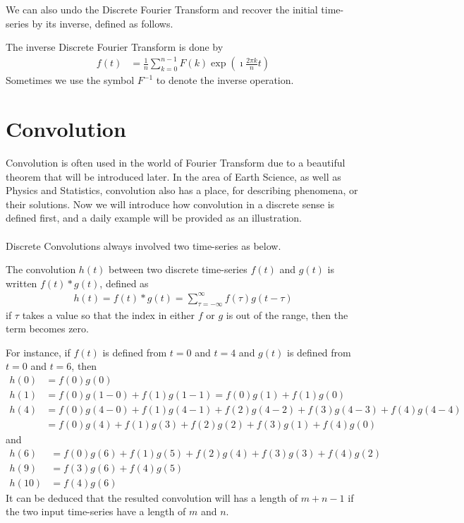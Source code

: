 We can also undo the Discrete Fourier Transform and recover the initial time-series by its inverse, defined as follows.
\begin{defn}
The inverse Discrete Fourier Transform is done by
\begin{align*}
f(t) &= \frac{1}{n}\sum_{k=0}^{n-1} F(k)\exp(\imath\frac{2\pi k}{n}t)
\end{align*}
Sometimes we use the symbol $F^{-1}$ to denote the inverse operation.
\end{defn}

\section{Convolution}
Convolution is often used in the world of Fourier Transform due to a beautiful theorem that will be introduced later. In the area of Earth Science, as well as Physics and Statistics, convolution also has a place, for describing phenomena, or their solutions. Now we will introduce how convolution in a discrete sense is defined first, and a daily example will be provided as an illustration.\\
\\
Discrete Convolutions always involved two time-series as below.
\begin{defn}
The convolution $h(t)$ between two discrete time-series $f(t)$ and $g(t)$ is written $f(t) * g(t)$, defined as
\begin{align*}
h(t) = f(t) * g(t) = \sum_{\tau=-\infty}^{\infty} f(\tau) g(t-\tau)
\end{align*}
if $\tau$ takes a value so that the index in either $f$ or $g$ is out of the range, then the term becomes zero.
\end{defn}
For instance, if $f(t)$ is defined from $t = 0$ and $t = 4$ and $g(t)$ is defined from $t = 0$ and $t = 6$, then
\begin{align*}
h(0) &= f(0)g(0) \\
h(1) &= f(0)g(1-0) + f(1)g(1-1) = f(0)g(1) + f(1)g(0) \\
h(4) &= f(0)g(4-0) + f(1)g(4-1) + f(2)g(4-2) + f(3)g(4-3) + f(4)g(4-4) \\
&= f(0)g(4) + f(1)g(3) + f(2)g(2) + f(3)g(1) + f(4)g(0)
\end{align*}
and
\begin{align*}
h(6) &= f(0)g(6) + f(1)g(5) + f(2)g(4) + f(3)g(3) + f(4)g(2) \\
h(9) &= f(3)g(6) + f(4)g(5) \\
h(10) &= f(4)g(6)
\end{align*}
It can be deduced that the resulted convolution will has a length of $m + n - 1$ if the two input time-series have a length of $m$ and $n$.

